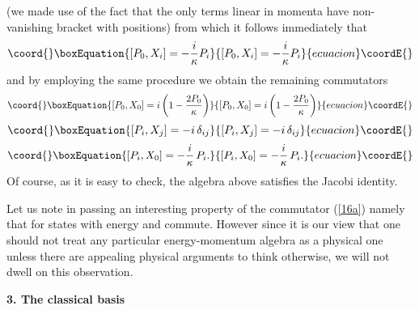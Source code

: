 \documentclass [prd,twocolumn,nofootinbib,showpacs]  {revtex4}
\begin{document}
(we made use of the fact that the only terms linear in momenta
have non-vanishing bracket with positions) from which it follows
immediately that
\begin{equation}\coord{}\boxEquation{\label{16b}
 [P_0, X_i] =  -\frac{i}\kappa P_i
}{[P_0, X_i] =  -\frac{i}\kappa P_i
}{ecuacion}\coordE{}\end{equation}
and by employing the same procedure we obtain the remaining
commutators
\begin{equation}\coord{}\boxEquation{\label{16a}
 [P_0, X_0] = i\left(1 - \frac{2P_0}\kappa \right)
}{[P_0, X_0] = i\left(1 - \frac{2P_0}\kappa \right)
}{ecuacion}\coordE{}\end{equation}
\begin{equation}\coord{}\boxEquation{\label{16c}
  [P_i, X_j] = -i \, \delta_{ij}
}{[P_i, X_j] = -i \, \delta_{ij}
}{ecuacion}\coordE{}\end{equation}
\begin{equation}\coord{}\boxEquation{\label{16d}
 [P_i, X_0] = -\frac{i}\kappa\, P_i.
}{[P_i, X_0] = -\frac{i}\kappa\, P_i.
}{ecuacion}\coordE{}\end{equation}
Of course, as it is easy to check, the algebra above satisfies the
Jacobi identity.

Let us note in passing an interesting property of the commutator
(\ref{16a}) namely  that for states with energy \coordHE{}  \coordHE{}
and \coordHE{} commute. However since it is our view that one should
not treat any particular energy-momentum algebra as a physical one
unless there are appealing physical arguments to think otherwise,
we will not dwell on this observation.
\newline

\noindent
\textbf{ 3. The classical basis}
\newline
\end{document}
